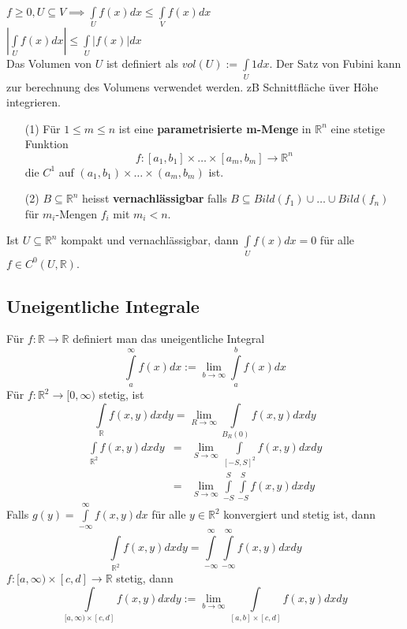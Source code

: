     $f\geq0,U\subseteq V\implies\int\limits_Uf(x)dx\leq\int\limits_Vf(x)dx$\\
    $\left|\int\limits_Uf(x)dx\right|\leq\int\limits_U\left|f(x)\right|dx$\\
    Das Volumen von $U$ ist definiert als $vol(U):=\int\limits_U1dx$. Der Satz von
    Fubini kann zur berechnung des Volumens verwendet werden. zB Schnittfläche
    üver Höhe integrieren.\\
    \begin{enumerate}
      \item[(1)] Für $1\leq m\leq n$ ist eine \textbf{parametrisierte m-Menge} 
        in $\mathbb R^n$ eine stetige Funktion
        $$f:[a_1,b_1]\times\dots\times[a_m,b_m]\rightarrow\mathbb R^n$$ die
        $C^1$ auf $(a_1,b_1)\times\dots\times(a_m,b_m)$ ist.
      \item[(2)] $B\subseteq\mathbb R^n$ heisst \textbf{vernachlässigbar} falls
        $B\subseteq Bild(f_1)\cup\dots\cup Bild(f_n)$ für $m_i$-Mengen $f_i$ mit
        $m_i<n$.
    \end{enumerate}
    Ist $U\subseteq\mathbb R^n$ kompakt und vernachlässigbar, dann
    $\int\limits_{U}f(x)dx=0$ für alle $f\in C^0(U,\mathbb R)$.\\
\subsection{Uneigentliche Integrale}
  Für $f:\mathbb R\rightarrow\mathbb R$ definiert man das uneigentliche Integral
  $$\int\limits_a^\infty
  f(x)dx:=\lim\limits_{b\rightarrow\infty}\int\limits_a^bf(x)dx$$
    Für $f:\mathbb R^2\rightarrow[0,\infty)$ stetig, ist $$\int\limits_{\mathbb
    R}f(x,y)dxdy=\lim\limits_{R\rightarrow\infty}\int\limits_{B_R(0)}f(x,y)dxdy$$
    $$\begin{array}{lcl}
      \int\limits_{\mathbb R^2}f(x,y)dxdy &=&
      \lim\limits_{S\rightarrow\infty}\int\limits_{[-S,S]^2}f(x,y)dxdy\\
      &=&\lim\limits_{S\rightarrow\infty}\int\limits_{-S}^S\int\limits_{-S}^Sf(x,y)dxdy
    \end{array}$$
    Falls $g(y)=\int\limits_{-\infty}^\infty f(x,y)dx$ für alle $y\in\mathbb
    R^2$ konvergiert und stetig ist, dann $$\int\limits_{\mathbb
    R^2}f(x,y)dxdy=\int\limits_{-\infty}^\infty\int\limits_{-\infty}^\infty
    f(x,y)dxdy$$
      $f:[a,\infty)\times[c,d]\rightarrow\mathbb R$ stetig, dann
      $$\int\limits_{[a,\infty)\times[c,d]}f(x,y)dxdy:=\lim\limits_{b\rightarrow\infty}
      \int\limits_{[a,b]\times[c,d]}f(x,y)dxdy$$
